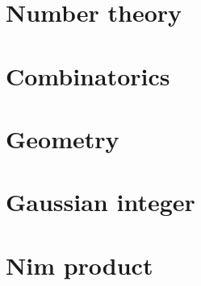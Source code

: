\section*{Number theory}
	

\section*{Combinatorics}
	

\section*{Geometry}
	

\section*{Gaussian integer}

\section*{Nim product}
